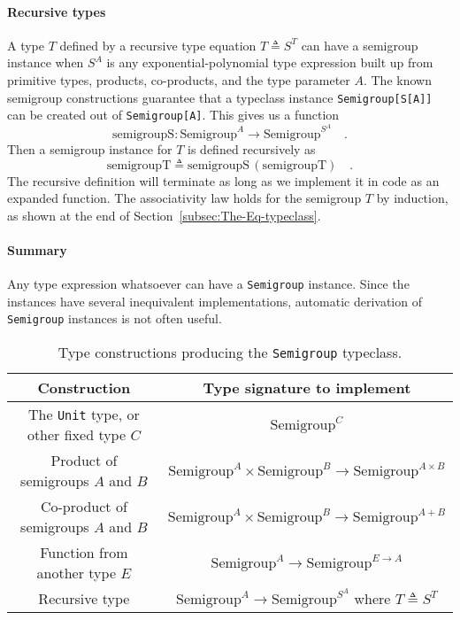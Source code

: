 \paragraph{Recursive types}

A type $T$ defined by a recursive type equation $T\triangleq S^{T}$
can have a semigroup instance when $S^{A}$ is any exponential-polynomial
type expression built up from primitive types, products, co-products,
and the type parameter $A$. The known semigroup constructions guarantee
that a typeclass instance \lstinline!Semigroup[S[A]]! can be created
out of \lstinline!Semigroup[A]!. This gives us a function 
\[
\text{semigroupS}:\text{Semigroup}^{A}\rightarrow\text{Semigroup}^{S^{A}}\quad.
\]
Then a semigroup instance for $T$ is defined recursively as
\[
\text{semigroupT}\triangleq\text{semigroupS}\,(\text{semigroupT})\quad.
\]
The recursive definition will terminate as long as we implement it
in code as an expanded function. The associativity law holds for the
semigroup $T$ by induction, as shown at the end of Section~\ref{subsec:The-Eq-typeclass}.

\paragraph{Summary}

Any type expression whatsoever can have a \lstinline!Semigroup! instance.
Since the instances have several inequivalent implementations, automatic
derivation of \lstinline!Semigroup! instances is not often useful.

\begin{table}
\begin{centering}
\begin{tabular}{|c|c|}
\hline 
\textbf{\footnotesize{}Construction} & \textbf{\footnotesize{}Type signature to implement}\tabularnewline
\hline 
\hline 
{\footnotesize{}The }\lstinline!Unit!{\footnotesize{} type, or other
fixed type $C$} & {\footnotesize{}$\text{Semigroup}^{C}$}\tabularnewline
\hline 
{\footnotesize{}Product of semigroups $A$ and $B$} & {\footnotesize{}$\text{Semigroup}^{A}\times\text{Semigroup}^{B}\rightarrow\text{Semigroup}^{A\times B}$}\tabularnewline
\hline 
{\footnotesize{}Co-product of semigroups $A$ and $B$} & {\footnotesize{}$\text{Semigroup}^{A}\times\text{Semigroup}^{B}\rightarrow\text{Semigroup}^{A+B}$}\tabularnewline
\hline 
{\footnotesize{}Function from another type $E$} & {\footnotesize{}$\text{Semigroup}^{A}\rightarrow\text{Semigroup}^{E\rightarrow A}$}\tabularnewline
\hline 
{\footnotesize{}Recursive type} & {\footnotesize{}$\text{Semigroup}^{A}\rightarrow\text{Semigroup}^{S^{A}}$
where $T\triangleq S^{T}$}\tabularnewline
\hline 
\end{tabular}
\par\end{centering}
\caption{Type constructions producing the \lstinline!Semigroup! typeclass.\label{tab:Type-constructions-for-semigroup}}
\end{table}



